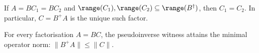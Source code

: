 \begin{theorem}\label{thm:factorization_unique}
  \leanok
  If $A = B C_1 = B C_2$ and $\range(C_1), \range(C_2) \subseteq \range(B^\dagger)$,
  then $C_1 = C_2$. In particular, $C = B^+ A$ is the unique such factor.
\end{theorem}

\begin{theorem}\label{thm:pinv_norm_minimal}
  \leanok
  For every factorisation $A = B C$, the pseudoinverse witness attains the minimal operator norm:
  $\|B^+ A\| \le \|C\|$.
\end{theorem}
